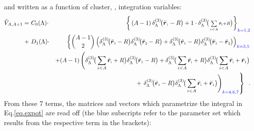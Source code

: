 \documentclass[aps,prd,onecolumn
,tightenlines,letterpaper,
notitlepage,11pt,
nofootinbib]{revtex4-1}
\begin{document}
and written as a function of cluster, \ie, integration variables:
\begin{eqnarray}
\hat{V}_{A,A+1}=&~C_0(\Lambda)\cdot&
\left\lbrace\,(A-1)\,\ddrei{\vcl{\red{1}}-R}+1\cdot
\ddrei{\scriptstyle \sum\limits_{i<A}\vcl{i}+R}\right\rbrace_{\blue{k=1,2}}\nonumber\\
+&~
D_1(\Lambda)\cdot&\left\lbrace{A-1\choose 2}\left(\ddrei{\vcl{1}-R}\ddrei{\vcl{2}-R}+
\ddrei{\vcl{1}-R}\ddrei{\vcl{1}-\vcl{2}}\right)_{\blue{k=3,5}}\right.\nonumber\\
&&+(A-1)\left(\ddrei{\sum\limits_{i<A}\vcl{i}+R}\ddrei{\vcl{1}-R}+\ddrei{\sum\limits_{i<A}\vcl{i}+R}\ddrei{\sum\limits_{i<A}\vcl{i}+\vcl{1}}\right.\nonumber\\
&&~\;\;\;\;\;\;\;\;\;\;\;\;\;+\left.\left.
\ddrei{\vcl{1}-R}\ddrei{\sum\limits_{i<A}\vcl{i}+\vcl{1}}\right)_{\blue{k=4,6,7}}\right\rbrace\;\;.
\end{eqnarray}
From these 7 terms, the matrices and vectors which parametrize the integral in
Eq.\eqref{eq.expot} are read off (the blue subscripts refer to the parameter set
which results from the respective term in the brackets):
%
\newpage
%
\arraycolsep=2.4pt\def\arraystretch{1.25}
\end{document}
